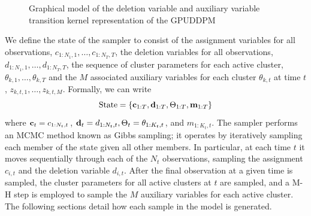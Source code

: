 \documentclass[smallcondensed, final]{svjour3}
\begin{document}
\begin{figure}[h]
        \caption{Graphical model of the deletion variable and auxiliary variable transition kernel representation of the GPUDDPM}
        \label{fig:gpuddpm_gm_2}
\end{figure}

We define the state of the sampler to consist of the assignment variables for all observations, $c_{1:N_{1},1}, \ldots, c_{1:N_{T}, T}$, the deletion variables for all observations, $d_{1:N_{1},1}, \ldots, d_{1:N_{T}, T}$, the sequence of cluster parameters for each active cluster, $\theta_{k,1}, \ldots, \theta_{k, T}$ and the $M$ associated auxiliary variables for each cluster $\theta_{k,t}$ at time $t$, $z_{k,t,1}, \ldots, z_{k, t, M}$. Formally, we can write
\begin{equation}
\text{State} = \{ \bold{c}_{1:T}, \bold{d}_{1:T}, \Theta_{1:T}, \bold{m}_{1:T} \}
\end{equation}
where $\bold{c}_{t} = c_{1:N_{t},t}$, $\bold{d}_{t} = d_{1:N_{t},t}, \Theta_{t} = \theta_{1:K_{t}, t}$, and $m_{1:K_{t},t}$.
The sampler performs an MCMC method known as Gibbs sampling; it operates by iteratively sampling each member of the state given all other members. In particular, at each time $t$ it moves sequentially through each of the $N_{t}$ observations, sampling the assignment $c_{i,t}$ and the deletion variable $d_{i,t}$. After the final observation at a given time is sampled, the cluster parameters for all active clusters at $t$ are sampled, and a M-H step is employed to sample the $M$ auxiliary variables for each active cluster. The following sections detail how each sample in the model is generated.
\end{document}
